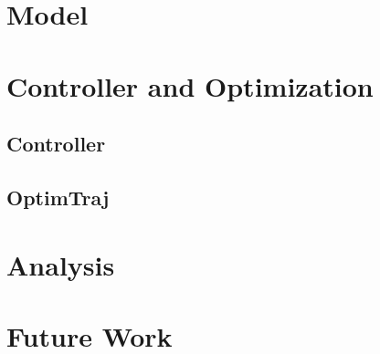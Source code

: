 \documentclass[12pt]{article}
\begin{document}
\section{Model}
\section{Controller and Optimization}
\subsection{Controller}
\subsection{OptimTraj}
\section{Analysis}
\section{Future Work}



\end{document}
